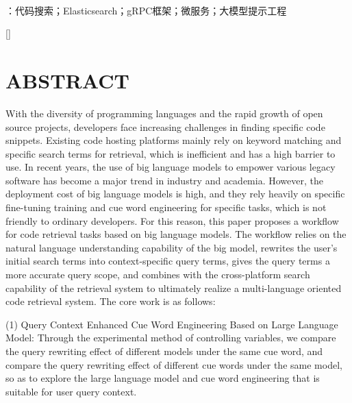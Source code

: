 \documentclass[UTF8,a4paper,12pt]{ctexart}
\numberwithin{equation}{section}
\renewcommand\thesection{\arabic{section}}
\begin{document}
~\\
：代码搜索；Elasticsearch；gRPC框架；微服务；大模型提示工程\\

\newpage
{}

\titleformat{\section}[block]{\centering\bfseries\fontspec{Times New Roman}\fontsize{16pt}{20pt}\selectfont}{\thesection}{1em}{}[]

\section*{ABSTRACT}
With the diversity of programming languages and the rapid growth of open source projects, developers face increasing challenges in finding specific code snippets. Existing code hosting platforms mainly rely on keyword matching and specific search terms for retrieval, which is inefficient and has a high barrier to use. In recent years, the use of big language models to empower various legacy software has become a major trend in industry and academia. However, the deployment cost of big language models is high, and they rely heavily on specific fine-tuning training and cue word engineering for specific tasks, which is not friendly to ordinary developers. For this reason, this paper proposes a workflow for code retrieval tasks based on big language models. The workflow relies on the natural language understanding capability of the big model, rewrites the user's initial search terms into context-specific query terms, gives the query terms a more accurate query scope, and combines with the cross-platform search capability of the retrieval system to ultimately realize a multi-language oriented code retrieval system. The core work is as follows:\par

(1) Query Context Enhanced Cue Word Engineering Based on Large Language Model: Through the experimental method of controlling variables, we compare the query rewriting effect of different models under the same cue word, and compare the query rewriting effect of different cue words under the same model, so as to explore the large language model and cue word engineering that is suitable for user query context. \par
\end{document}
